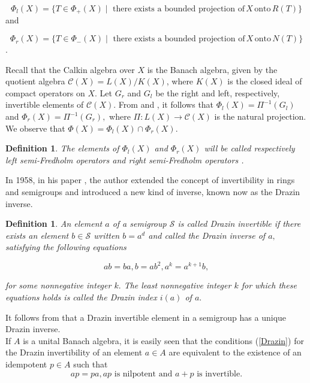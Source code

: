 \documentclass[10pt]{article}
\newcommand{\bdf}{\begin{definition}}
\newcommand{\edf}{\end{definition}}
\newtheorem{definition}[theorem]{Definition}
\numberwithin{equation}{section}
\begin{document}
\noindent 

$$\Phi_l(X) = \{T \in \Phi_+ (X) \mid \text { there exists a bounded projection of}\,  X\,  \text{onto}\, R(T)\} $$  and

$$\Phi_r (X) = \{T \in \Phi_-(X)\mid  \text { there exists a bounded projection of}\,  X\,  \text{onto}\, N(T) \}$$.

\noindent Recall that the Calkin algebra over $X$ is the Banach algebra, given by  the quotient algebra
$\mathcal{C}(X)=L(X)/K(X)$, where  $K(X)$ is the closed ideal of
compact operators on $X$.  Let $G_r$ and $G_l$   be the right and left, respectively, invertible elements
  of $ \mathcal{C}(X)$. From \cite[Theorem 4.3.2]{CPY}    and  \cite[Theorem 4.3.3]{CPY},
   it follows that $ \Phi_l (X)= \Pi^{-1}(G_l)$  and  $ \Phi_r (X)= \Pi^{-1}(G_r),$
     where $ \Pi: L(X) \rightarrow  \mathcal{C}(X)$ is the natural projection. We observe that $\Phi(X)= \Phi_l (X)\cap \Phi_r(X).$

  \bdf \label{left-right semi}The elements of  $ \Phi_l (X)$ and   $\Phi_r (X)$ will be  called respectively left
    semi-Fredholm operators and   right  semi-Fredholm operators .

  \edf




In 1958, in his paper \cite{DR},  the author  extended the
concept of invertibility in  rings and semigroups and introduced a
new kind of inverse, known now as the  Drazin inverse.


\bdf \label{def-Drazin}An element  $a$  of  a semigroup $ \mathcal{S}$ is called
Drazin invertible if there exists an element $b \in \mathcal{S}$ written $ b= a^d$  and called the Drazin inverse of $a,$
satisfying the following equations

\begin{equation}\label{Drazin}
  ab = ba, b=ab^2, a^k= a^{k+1}b,
 \end{equation}

 for some nonnegative integer $k.$ The least nonnegative
integer $k$ for which these equations holds is called  the Drazin index $
i(a)$ of $a.$



\edf




\noindent It follows from \cite{DR} that a Drazin invertible
element in a semigroup has a unique Drazin inverse.\\
If $A$ is a unital Banach algebra,  it is easily seen that the conditions  (\ref{Drazin}) for the Drazin invertibility of an element $ a\in A$  are equivalent to the existence of an idempotent $ p \in A $ such that  $$ap=pa, ap \text{ is nilpotent and} \,\,  a+p   \text{ is   invertible}. $$
\end{document}
